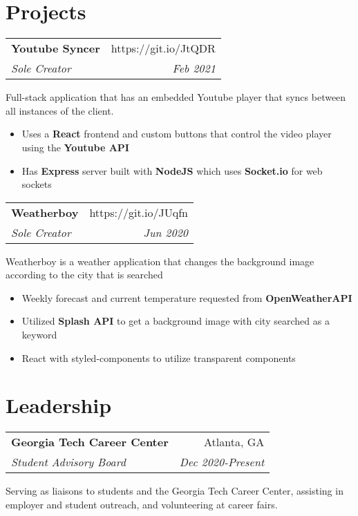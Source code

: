 \documentclass[letterpaper,8pt]{article}
\makeatletter
\newcommand{\resumeSubheading}[4]{
  \vspace{0.25em}
  \begin{tabular*}{1\textwidth}[t]{l@{\extracolsep{\fill}}r}
    \textbf{#1} & #2 \\
    \textit{#3} & \textit{#4} \\
  \end{tabular*}\vspace{-5pt}
}
\makeatother
\begin{document}
\section{Projects}

\resumeSubheading{Youtube Syncer}{https://git.io/JtQDR}{Sole Creator}{Feb 2021}

Full-stack application that has an embedded Youtube player that syncs between all instances of the client.

\begin{itemize}[label=\raisebox{0.25ex}{\tiny$\bullet$}]
    \item Uses a \textbf{React} frontend and custom buttons that control the video player using the \textbf{Youtube API}
    \item Has \textbf{Express} server built with \textbf{NodeJS} which uses \textbf{Socket.io} for web sockets
\end{itemize}
\vspace{5pt}

\resumeSubheading{Weatherboy}{https://git.io/JUqfn}{Sole Creator}{Jun 2020}

Weatherboy is a weather application that changes the background image according to the city that is searched

\begin{itemize}[label=\raisebox{0.25ex}{\tiny$\bullet$}]
  \item Weekly forecast and current temperature requested from \textbf{OpenWeatherAPI}
  \item Utilized \textbf{Splash API} to get a background image with city searched as a keyword
  \item React with styled-components to utilize transparent components
\end{itemize}
\vspace{5pt}

\section{Leadership}

\resumeSubheading{Georgia Tech Career Center}
{Atlanta, GA}{Student Advisory Board}{Dec 2020-Present}

Serving as liaisons to students and the Georgia Tech Career Center, assisting in employer and student outreach, and volunteering at career fairs.
\end{document}

